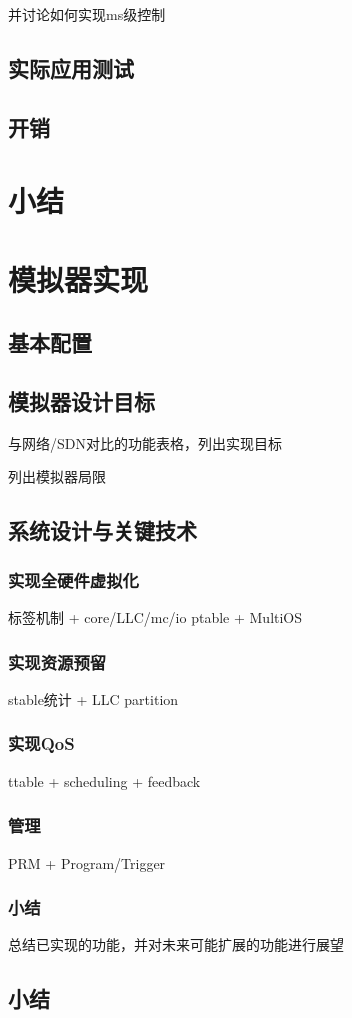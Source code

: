 并讨论如何实现ms级控制

\subsection{实际应用测试}

\subsection{开销}


\section{小结}



\section{模拟器实现}
\subsection{基本配置}

\subsection{模拟器设计目标}

与网络/SDN对比的功能表格，列出实现目标

列出模拟器局限

\subsection{系统设计与关键技术}

\subsubsection{实现全硬件虚拟化}

标签机制 + core/LLC/mc/io
ptable + MultiOS

\subsubsection{实现资源预留}

stable统计 + LLC partition

\subsubsection{实现QoS}

ttable + scheduling + feedback

\subsubsection{管理}

PRM + Program/Trigger

\subsubsection{小结}

总结已实现的功能，并对未来可能扩展的功能进行展望

\subsection{小结}

\fi


